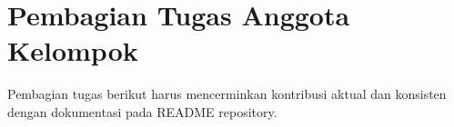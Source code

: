 \section{Pembagian Tugas Anggota Kelompok}
Pembagian tugas berikut harus mencerminkan kontribusi aktual dan konsisten
dengan dokumentasi pada README repository.
